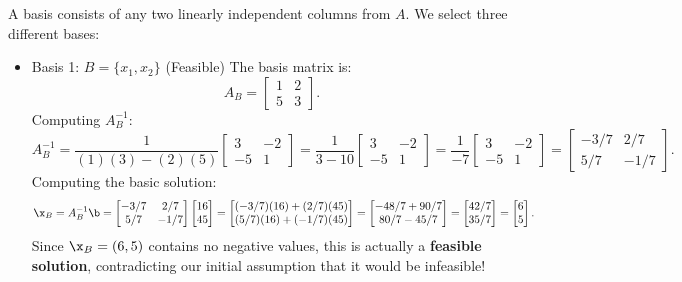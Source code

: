A basis consists of any two linearly independent columns from \( A \). We select three different bases:
\begin{itemize}
\item  Basis 1: \(B= \{x_1, x_2\} \) (Feasible)
The basis matrix is:
\[
A_B =
\begin{bmatrix}
    1 & 2 \\
    5 & 3
\end{bmatrix}.
\]
Computing \( A_B^{-1} \):
\[
A_B^{-1} =
\frac{1}{(1)(3) - (2)(5)}
\begin{bmatrix}
    3 & -2 \\
    -5 & 1
\end{bmatrix}
=
\frac{1}{3 - 10}
\begin{bmatrix}
    3 & -2 \\
    -5 & 1
\end{bmatrix}
=
\frac{1}{-7}
\begin{bmatrix}
    3 & -2 \\
    -5 & 1
\end{bmatrix}
=
\begin{bmatrix}
    -3/7 & 2/7 \\
    5/7 & -1/7
\end{bmatrix}.
\]
Computing the basic solution:
\[
\x_B = A_B^{-1}\b=
\begin{bmatrix}
    -3/7 & 2/7 \\
    5/7 & -1/7
\end{bmatrix}
\begin{bmatrix}
    16 \\ 45
\end{bmatrix}
=
\begin{bmatrix}
    (-3/7)(16) + (2/7)(45) \\
    (5/7)(16) + (-1/7)(45)
\end{bmatrix}
=
\begin{bmatrix}
    -48/7 + 90/7 \\
    80/7 - 45/7
\end{bmatrix}
=
\begin{bmatrix}
    42/7 \\
    35/7
\end{bmatrix}
=
\begin{bmatrix}
    6 \\ 5
\end{bmatrix}.
\]
Since \( \x_B = (6,5) \) contains no negative values, this is actually a \textbf{feasible solution}, contradicting our initial assumption that it would be infeasible!


\end{itemize}
